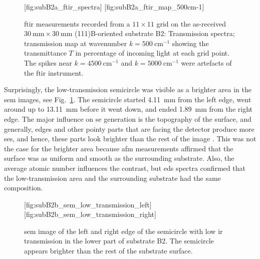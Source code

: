 \begin{figure}[htbp]
    \centering
    [fig:subB2a_ftir_spectra]
    \hfill
    [fig:subB2a_ftir_map_500cm-1]
    \caption[\Ac{ftir} measurements of the as-received substrate B2.]{\Ac{ftir} measurements recorded from a $11\times11$ grid on the as-received $\SI{30}{\milli\metre}\times\SI{30}{\milli\metre}$ (111)B-oriented substrate B2:  Transmission spectra;  transmission map at wavenumber $k=\SI{500}{\centi\metre^{-1}}$ showing the transmittance $T$ in percentage of incoming light at each grid point. The spikes near $k=\SI{4500}{\centi\metre^{-1}}$ and $k=\SI{5000}{\centi\metre^{-1}}$ were artefacts of the \ac{ftir} instrument.}
\end{figure}

Surprisingly, the low-transmission semicircle was visible as a brighter area in the \ac{sem} images, see Fig.~\ref{fig:subB2b_sem_low_transmission}. The semicircle started \SI{4.11}{\milli\metre} from the left edge, went around up to \SI{13.11}{\milli\metre} before it went down, and ended \SI{1.89}{\milli\metre} from the right edge. The major influence on \ac{se} generation is the topography of the surface, and generally, edges and other pointy parts that are facing the detector produce more \acp{se}, and hence, these parts look brighter than the rest of the image \citep{goldstein2012scanning}. This was not the case for the brighter area because \ac{afm} measurements affirmed that the surface was as uniform and smooth as the surrounding substrate. Also, the average atomic number influences the contrast, but \ac{eds} spectra confirmed that the low-transmission area and the surrounding substrate had the same composition.

\begin{figure}[htbp]
    \centering
    [fig:subB2b_sem_low_transmission_left]
    \hfill
    [fig:subB2b_sem_low_transmission_right]
    \caption[\Ac{sem} image of the semicircle with low \ac{ir} transmission on substrate B2.]{\Ac{sem} image of the  left and  right edge of the semicircle with low \ac{ir} transmission in the lower part of substrate B2. The semicircle appears brighter than the rest of the substrate surface.}\label{fig:subB2b_sem_low_transmission}
\end{figure}

